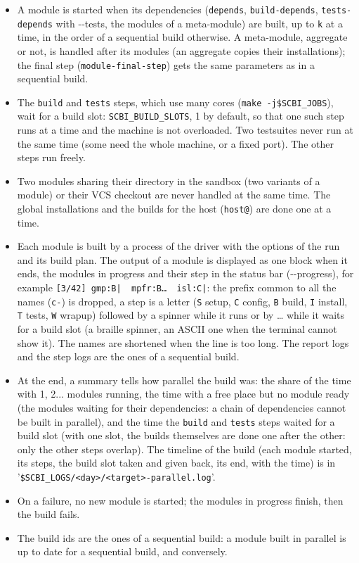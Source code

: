 \documentclass[a4paper,12pt,twoside]{article}
\newcommand{\code}[1]{\texttt{#1}}
\newcommand{\file}[1]{'{\texttt{#1}}'}
\newcommand{\ddash}{-{}-}
\begin{document}
\begin{itemize}
	\item A module is started when its dependencies (\code{depends}, \code{build-depends}, \code{tests-depends} with \ddash{}tests, the modules of a meta-module) are built, up to \code{k} at a time, in the order of a sequential build otherwise. A meta-module, aggregate or not, is handled after its modules (an aggregate copies their installations); the final step (\code{module-final-step}) gets the same parameters as in a sequential build.

	\item {}The \code{build} and \code{tests} steps, which use many cores (\code{make -j\$SCBI\_JOBS}), wait for a build slot: \code{SCBI\_BUILD\_SLOTS}, 1 by default, so that one such step runs at a time and the machine is not overloaded. Two testsuites never run at the same time (some need the whole machine, or a fixed port). The other steps run freely.

	\item Two modules sharing their directory in the sandbox (two variants of a module) or their VCS checkout are never handled at the same time. The global installations and the builds for the host (\code{host@}) are done one at a time.

	\item Each module is built by a process of the driver with the options of the run and its build plan. The output of a module is displayed as one block when it ends, the modules in progress and their step in the status bar (\ddash{}progress), for example \code{[3/42] gmp:B|~~mpfr:B\ldots{}~~isl:C|}: the prefix common to all the names (\code{c-}) is dropped, a step is a letter (\code{S} setup, \code{C} config, \code{B} build, \code{I} install, \code{T} tests, \code{W} wrapup) followed by a spinner while it runs or by \ldots{} while it waits for a build slot (a braille spinner, an ASCII one when the terminal cannot show it). The names are shortened when the line is too long. The report logs and the step logs are the ones of a sequential build.

	\item At the end, a summary tells how parallel the build was: the share of the time with 1, 2... modules running, the time with a free place but no module ready (the modules waiting for their dependencies: a chain of dependencies cannot be built in parallel), and the time the \code{build} and \code{tests} steps waited for a build slot (with one slot, the builds themselves are done one after the other: only the other steps overlap). The timeline of the build (each module started, its steps, the build slot taken and given back, its end, with the time) is in \file{\$SCBI\_LOGS/<day>/<target>-parallel.log}.

	\item On a failure, no new module is started; the modules in progress finish, then the build fails.

	\item The build ids are the ones of a sequential build: a module built in parallel is up to date for a sequential build, and conversely.
\end{itemize}
\end{document}
